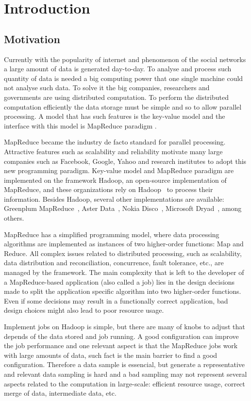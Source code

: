 \chapter{Introduction} %
\label{cha:introduction}

\section{Motivation}

Currently with the popularity of internet and phenomenon of the social
networks a large amount of data is generated day-to-day. To analyse and
process such quantity of data is needed a big computing power that one
single machine could not analyse such data. To solve it the big companies,
researchers and governments are using distributed computation. To perform
the distributed computation efficiently the data storage must be simple
and so to allow parallel processing. A model that has such features
is the key-value model and the interface with this model is MapReduce
paradigm \cite{Dean:2004}.

MapReduce became the industry de facto standard for parallel processing.
Attractive features such as scalability and reliability motivate many large companies
such as Facebook, Google, Yahoo and research institutes to adopt this new programming
paradigm. Key-value model and MapReduce paradigm are implemented on the framework
Hadoop, an open-source implementation of MapReduce, and these organizations rely
on Hadoop~\cite{White:2009} to process their information. Besides Hadoop, several
other implementations are available: Greenplum MapReduce~\cite{Greenplum:2008},
Aster Data~\cite{Aster:2011}, Nokia Disco~\cite{Mundkur:2011}, 
Microsoft Dryad~\cite{Isard:2007}, among others.

MapReduce has a simplified programming model, where data processing algorithms 
are implemented as instances of two higher-order functions: Map and Reduce. All 
complex issues related to distributed processing, such as scalability, data
distribution and reconciliation, concurrence, fault tolerance, etc., are managed
by the framework. The main complexity that is left to the developer of a 
MapReduce-based application (also called a job) lies in the design decisions made 
to split the application specific algorithm into two higher-order functions. Even
if some decisions may result in a functionally correct application, bad design
choices might also lead to poor resource usage.

Implement jobs on Hadoop is simple, but there are many of knobs to adjust that
depends of the data stored and job running. A good configuration can improve the
job performance and one relevant aspect is that the MapReduce jobs work with
large amounts of data, such fact is the main barrier to find a good configuration.
Therefore a data sample is essencial, but generate a representative and relevant
data sampling is hard and a bad sampling may not represent several aspects
related to the computation in large-scale: efficient resource usage, correct
merge of data, intermediate data, etc.


